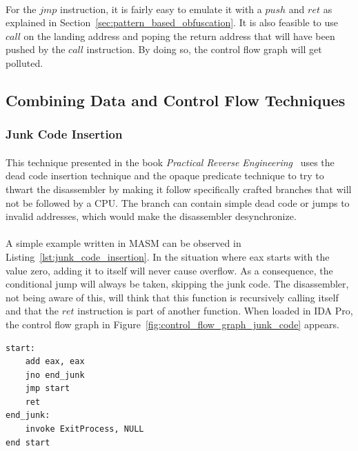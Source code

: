 \paragraph{}
For the $jmp$ instruction, it is fairly easy to emulate it with a $push$ and $ret$ as explained in Section~\ref{sec:pattern_based_obfuscation}. It is also feasible to use $call$ on the landing address and poping the return address that will have been pushed by the $call$ instruction. By doing so, the control flow graph will get polluted.

\subsection{Combining Data and Control Flow Techniques}
\subsubsection{Junk Code Insertion}
\paragraph{}
This technique presented in the book \textit{Practical Reverse Engineering}~\cite{Dang:2014:PRE:2636663} uses the dead code insertion technique and the opaque predicate technique to try to thwart the disassembler by making it follow specifically crafted branches that will not be followed by a CPU. The branch can contain simple dead code or jumps to invalid addresses, which would make the disassembler desynchronize.

\paragraph{}
A simple example written in MASM can be observed in Listing~\ref{lst:junk_code_insertion}. In the situation where eax starts with the value zero, adding it to itself will never cause overflow. As a consequence, the conditional jump will always be taken, skipping the junk code. The disassembler, not being aware of this, will think that this function is recursively calling itself and that the $ret$ instruction is part of another function. When loaded in IDA Pro, the control flow graph in Figure~\ref{fig:control_flow_graph_junk_code} appears. \\
\begin{lstlisting}[caption={Inserting junk code to trick the disassembler into believing that the function is recursive and that $ret$ is part of another function.}, label={lst:junk_code_insertion}, frame=tlrb, language={[x86masm]Assembler}]
start:
	add eax, eax
	jno end_junk
	jmp start
	ret
end_junk:
	invoke ExitProcess, NULL
end start
\end{lstlisting}


